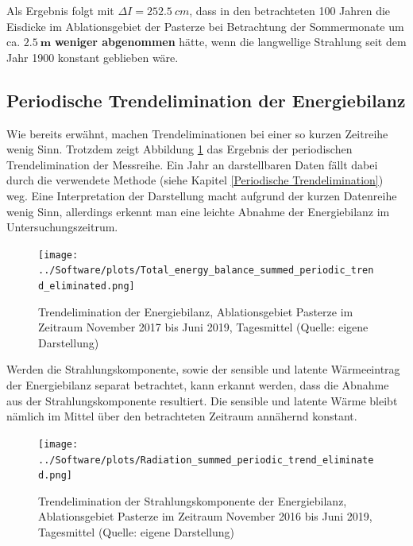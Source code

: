 \documentclass[11pt,a4paper]{article}
\begin{document}
Als Ergebnis folgt mit $\Delta I = 252.5~cm$, dass in den betrachteten 100 Jahren die Eisdicke im Ablationsgebiet der Pasterze bei Betrachtung der Sommermonate um ca. $\mathbf{2.5~m}$ \textbf{weniger abgenommen} hätte, wenn die langwellige Strahlung seit dem Jahr 1900 konstant geblieben wäre.



\subsection{Periodische Trendelimination der Energiebilanz}

Wie bereits erwähnt, machen Trendeliminationen bei einer so kurzen Zeitreihe wenig Sinn. Trotzdem zeigt Abbildung \ref{fig:Trendelimination der Energiebilanz} das Ergebnis der periodischen Trendelimination der Messreihe. Ein Jahr an darstellbaren Daten fällt dabei durch die verwendete Methode (siehe Kapitel \ref{Periodische Trendelimination}) weg. Eine Interpretation der Darstellung macht aufgrund der kurzen Datenreihe wenig Sinn, allerdings erkennt man eine leichte Abnahme der Energiebilanz im Untersuchungszeitrum.

\begin{figure}[H]
\centering
\texttt{[image: ../Software/plots/Total\_energy\_balance\_summed\_periodic\_trend\_eliminated.png]}
\caption[Trendelimination der Energiebilanz, Ablationsgebiet Pasterze im Zeitraum November 2017 bis Juni 2019, Tagesmittel]{Trendelimination der Energiebilanz, Ablationsgebiet Pasterze im Zeitraum November 2017 bis Juni 2019, Tagesmittel (Quelle: eigene Darstellung)}
\label{fig:Trendelimination der Energiebilanz}
\end{figure}

Werden die Strahlungskomponente, sowie der sensible und latente Wärmeeintrag der Energiebilanz separat betrachtet, kann erkannt werden, dass  die Abnahme aus der Strahlungskomponente resultiert. Die sensible und latente Wärme bleibt nämlich im Mittel über den betrachteten Zeitraum annähernd konstant.

\begin{figure}[H]
\centering
\texttt{[image: ../Software/plots/Radiation\_summed\_periodic\_trend\_eliminated.png]}
\caption[Trendelimination der Strahlungskomponente der Energiebilanz, Ablationsgebiet Pasterze im Zeitraum November 2016 bis Juni 2019, Tagesmittel]{Trendelimination der Strahlungskomponente der Energiebilanz, Ablationsgebiet Pasterze im Zeitraum November 2016 bis Juni 2019, Tagesmittel (Quelle: eigene Darstellung)}
\label{fig:Trendelimination der Strahlungskomponente der Energiebilanz}
\end{figure}
\end{document}
